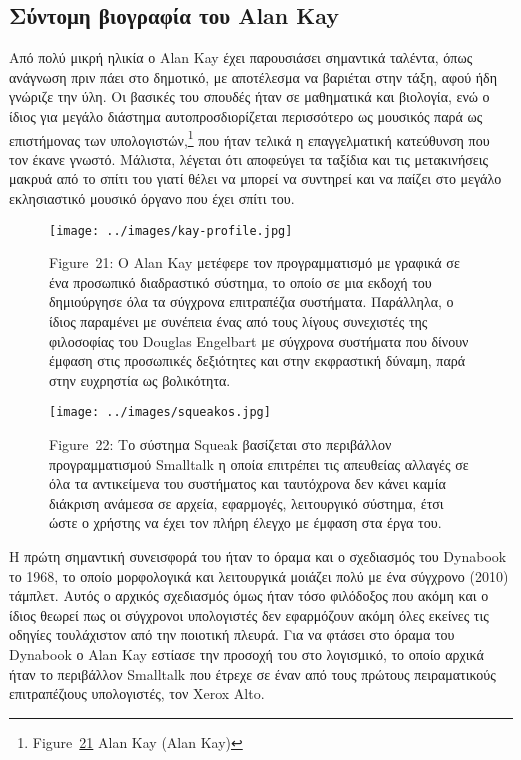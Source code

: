 \documentclass[
]{article}
\begin{document}
\hypertarget{ux3c3ux3cdux3bdux3c4ux3bfux3bcux3b7-ux3b2ux3b9ux3bfux3b3ux3c1ux3b1ux3c6ux3afux3b1-ux3c4ux3bfux3c5-alan-kay}{%
\subsection{Σύντομη βιογραφία του Alan
Kay}\label{ux3c3ux3cdux3bdux3c4ux3bfux3bcux3b7-ux3b2ux3b9ux3bfux3b3ux3c1ux3b1ux3c6ux3afux3b1-ux3c4ux3bfux3c5-alan-kay}}

Από πολύ μικρή ηλικία ο Alan Kay έχει παρουσιάσει σημαντικά ταλέντα,
όπως ανάγνωση πριν πάει στο δημοτικό, με αποτέλεσμα να βαριέται στην
τάξη, αφού ήδη γνώριζε την ύλη. Οι βασικές του σπουδές ήταν σε
μαθηματικά και βιολογία, ενώ ο ίδιος για μεγάλο διάστημα
αυτοπροσδιορίζεται περισσότερο ως μουσικός παρά ως επιστήμονας των
υπολογιστών,\footnote{Figure~\protect\hyperlink{fig:kay-profile}{21}
  Alan Kay (Alan Kay)} που ήταν τελικά η επαγγελματική κατεύθυνση που
τον έκανε γνωστό. Μάλιστα, λέγεται ότι αποφεύγει τα ταξίδια και τις
μετακινήσεις μακρυά από το σπίτι του γιατί θέλει να μπορεί να συντηρεί
και να παίζει στο μεγάλο εκλησιαστικό μουσικό όργανο που έχει σπίτι του.

\leavevmode{}%
\begin{figure}
\hypertarget{fig:kay-profile}{%
\centering
\texttt{[image: ../images/kay-profile.jpg]}
\caption{Figure~21: Ο Alan Kay μετέφερε τον προγραμματισμό με γραφικά σε
ένα προσωπικό διαδραστικό σύστημα, το οποίο σε μια εκδοχή του
δημιούργησε όλα τα σύγχρονα επιτραπέζια συστήματα. Παράλληλα, ο ίδιος
παραμένει με συνέπεια ένας από τους λίγους συνεχιστές της φιλοσοφίας του
Douglas Engelbart με σύγχρονα συστήματα που δίνουν έμφαση στις
προσωπικές δεξιότητες και στην εκφραστική δύναμη, παρά στην ευχρηστία ως
βολικότητα.}\label{fig:kay-profile}
}
\end{figure}

\leavevmode{}%
\begin{figure}
\hypertarget{fig:squeakos}{%
\centering
\texttt{[image: ../images/squeakos.jpg]}
\caption{Figure~22: Το σύστημα Squeak βασίζεται στο περιβάλλον
προγραμματισμού Smalltalk η οποία επιτρέπει τις απευθείας αλλαγές σε όλα
τα αντικείμενα του συστήματος και ταυτόχρονα δεν κάνει καμία διάκριση
ανάμεσα σε αρχεία, εφαρμογές, λειτουργικό σύστημα, έτσι ώστε ο χρήστης
να έχει τον πλήρη έλεγχο με έμφαση στα έργα του.}\label{fig:squeakos}
}
\end{figure}

Η πρώτη σημαντική συνεισφορά του ήταν το όραμα και ο σχεδιασμός του
Dynabook το 1968, το οποίο μορφολογικά και λειτουργικά μοιάζει πολύ με
ένα σύγχρονο (2010) τάμπλετ. Αυτός ο αρχικός σχεδιασμός όμως ήταν τόσο
φιλόδοξος που ακόμη και ο ίδιος θεωρεί πως οι σύγχρονοι υπολογιστές δεν
εφαρμόζουν ακόμη όλες εκείνες τις οδηγίες τουλάχιστον από την ποιοτική
πλευρά. Για να φτάσει στο όραμα του Dynabook ο Alan Kay εστίασε την
προσοχή του στο λογισμικό, το οποίο αρχικά ήταν το περιβάλλον Smalltalk
που έτρεχε σε έναν από τους πρώτους πειραματικούς επιτραπέζιους
υπολογιστές, τον Xerox Alto.
\end{document}
